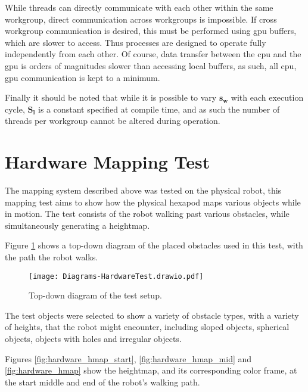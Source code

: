             While threads can directly communicate with each other within the same workgroup, direct communication across workgroups is
            impossible. If cross workgroup communication is desired, this must be performed using \ac{gpu} buffers, which are slower to access. Thus processes are
            designed to operate fully independently from each other. Of course, data transfer between the \ac{cpu} and the \ac{gpu} is orders of magnitudes
            slower than accessing local buffers, as such, all \ac{cpu}, \ac{gpu} communication is kept to a minimum.
            
            Finally it should be noted that while it is possible to vary \(\bm{s_w}\) with each execution cycle, \(\bm{S_l}\) is a constant specified at compile time,
            and as such the number of threads per workgroup cannot be altered during operation.

    \newpage
    \section{Hardware Mapping Test}\label{sec:hardware_hmap}
        The mapping system described above was tested on the physical robot, this mapping test aims to show how the physical hexapod maps various objects while in motion.
        The test consists of the robot walking past various obstacles, while simultaneously generating a heightmap.

        Figure \ref{fig:hardware_map_diag} shows a top-down diagram of the placed obstacles used in this test, with the path the robot walks.
        \begin{figure}[h]
            \centering
            \texttt{[image: Diagrams-HardwareTest.drawio.pdf]}
            \caption{Top-down diagram of the test setup.}
            \label{fig:hardware_map_diag}
        \end{figure}

        \noindent
        The test objects were selected to show a variety of obstacle types, with a variety of heights, that the robot might encounter, including sloped objects, spherical objects, objects
        with holes and irregular objects. 

        Figures \ref{fig:hardware_hmap_start}, \ref{fig:hardware_hmap_mid} and \ref{fig:hardware_hmap} show the heightmap, and its corresponding color frame, at the start middle and end of the
        robot's walking path.
        
